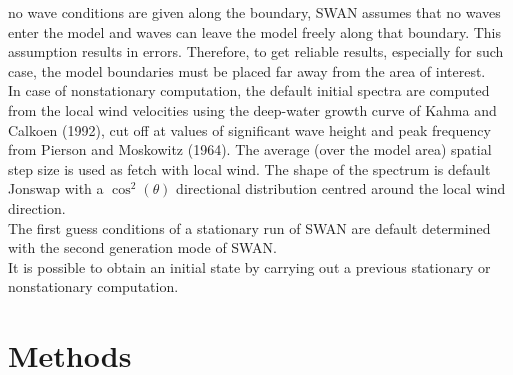 \documentclass[12pt]{book}
\begin{document}
no wave conditions are given along the boundary, SWAN assumes that no waves enter the model
and waves can leave the model freely along that boundary. This assumption results in errors.
Therefore, to get reliable results, especially for such case, the model boundaries must be placed
far away from the area of interest.
\\[2ex]
\noindent
In case of nonstationary computation, the default initial spectra are computed from the local
wind velocities using the deep-water growth curve of Kahma and Calkoen (1992), cut off at values
of significant wave height and peak frequency from Pierson and Moskowitz (1964). The average
(over the model area) spatial step size is used as fetch with local wind. The shape of the
spectrum is default Jonswap with a $\cos^2 (\theta)$ directional distribution centred around
the local wind direction.
\\[2ex]
\noindent
The first guess conditions of a stationary run of SWAN are default determined with the second
generation mode of SWAN.
\\[2ex]
\noindent
It is possible to obtain an initial state by carrying out a previous stationary or nonstationary
computation.

 \label{ch:setup}

\section{Methods} \label{sec:meth}
\end{document}
